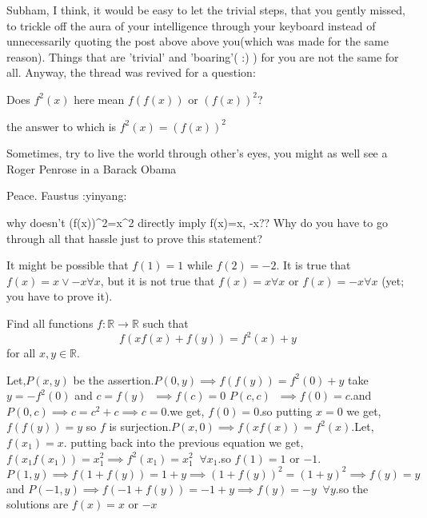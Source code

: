 \begin{solution}
	Subham, I think, it would be easy to let the trivial steps, that you gently missed, to trickle off the aura of your intelligence through your keyboard instead of unnecessarily quoting the post above above you(which was made for the same reason). Things that are 'trivial' and 'boaring'( :) ) for you are not the same for all. 
Anyway, the thread was revived for a question:
\begin{tcolorbox}Does $f^2(x)$ here mean $f(f(x))$ or $(f(x))^2$?\end{tcolorbox}
the answer to which is $f^2(x)=(f(x))^2$

\begin{tcolorbox}Sometimes, try to live the world through other's eyes, you might as well see a Roger Penrose in a Barack Obama\end{tcolorbox}
Peace.
Faustus
 :yinyang:
\end{solution}



\begin{solution}
	why doesn't (f(x))^2=x^2 directly imply f(x)=x, -x?? Why do you have to go through all that hassle just to prove this statement?
\end{solution}



\begin{solution}
	It might be possible that $f(1) = 1$ while $f(2) = -2$. It is true that $f(x) = x \vee -x \forall x$, but it is not true that $f(x) = x \forall x$ or $f(x) = -x \forall x$ (yet; you have to prove it).
\end{solution}



\begin{solution}
	\begin{tcolorbox}Find all functions $f: \mathbb R \to \mathbb R$ such that \[ f( xf(x) + f(y) ) = f^2(x) + y \] for all $x,y\in \mathbb R$.\end{tcolorbox}
Let,$P(x,y)$ be the assertion.$P(0,y) \implies f(f(y))=f^2(0)+y$ take $y=-f^2(0)$ and $c=f(y) \; \; \implies f(c)=0$
$P(c,c) \;\; \implies f(0)=c$.and $P(0,c) \implies c=c^2+c \implies c=0$.we get, $f(0)=0$.so putting $x=0$ we get, $f(f(y))=y$ so $f$ is surjection.$P(x,0) \implies f(xf(x))=f^2(x)$.Let, $f(x_1)=x$. putting back into the previous equation we get,$f(x_{1}f(x_{1}))=x^2_1 \implies f^2(x_1)=x^2_1 \;\; \forall x_1$.so $f(1)=1$ or $-1$.$P(1,y) \implies f(1+f(y))=1+y \implies(1+f(y))^2=(1+y)^2  \implies f(y)=y$ and $P(-1,y) \implies f(-1+f(y))= -1+y \implies f(y)=-y \;\; \forall y$.so the solutions are $f(x)=x$ or $-x$
\end{solution}



